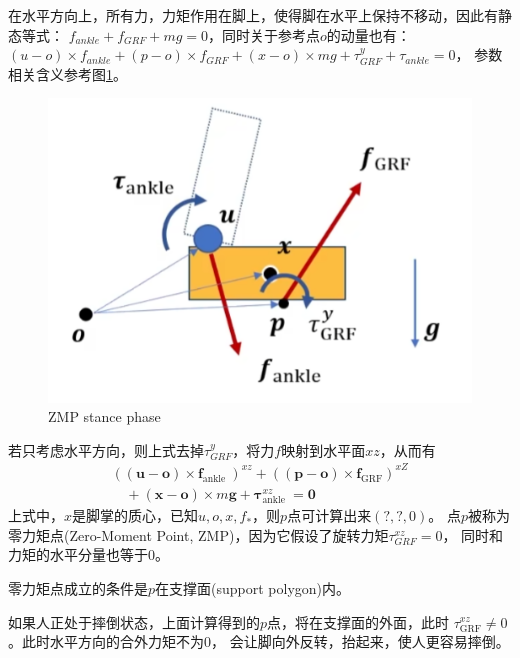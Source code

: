 \documentclass[lang=cn,newtx,10pt,scheme=chinese]{elegantbook}
\begin{document}
在水平方向上，所有力，力矩作用在脚上，使得脚在水平上保持不移动，因此有静态等式：
$f_{ankle} + f_{GRF} + mg = 0$，同时关于参考点$o$的动量也有：$(u -o)\times f_{ankle} + (p-o)\times f_{GRF}
+ (x-o)\times mg + \tau_{GRF}^{y} + \tau_{ankle} = 0 $，
参数相关含义参考图\ref{fig:ZMP-stance-phase}。
\begin{figure}[htbp]
  \centering
  \includegraphics[totalheight=1.6in]{"./image/ZMP-stance-phase.png"}
  \caption{ZMP stance phase} \label{fig:ZMP-stance-phase}
\end{figure}
若只考虑水平方向，则上式去掉$\tau_{GRF}^{y}$，将力$f$映射到水平面$xz$，从而有
\begin{equation}
  \begin{array}{r}
  \left((\boldsymbol{u}-\boldsymbol{o}) \times \boldsymbol{f}_{\text {ankle }}\right)^{x z}+\left((\boldsymbol{p}-\mathbf{o}) \times \boldsymbol{f}_{\mathrm{GRF}}\right)^{x Z} \\
  \quad+(\boldsymbol{x}-\boldsymbol{o}) \times m \boldsymbol{g}+\boldsymbol{\tau}_{\text {ankle }}^{x z}=\mathbf{0}
  \end{array}
\end{equation}
上式中，$x$是脚掌的质心，已知$u, o, x,f_{*}$，则$p$点可计算出来$(?,?,0)$。
点$p$被称为零力矩点(Zero-Moment Point, ZMP)，因为它假设了旋转力矩$\tau_{GRF}^{xz}=0$，
同时和力矩的水平分量也等于$0$。

零力矩点成立的条件是$p$在支撑面(support polygon)内。

如果人正处于摔倒状态，上面计算得到的$p$点，将在支撑面的外面，此时
$\tau_{\mathrm{GRF}}^{xz} \neq 0$。此时水平方向的合外力矩不为0，
会让脚向外反转，抬起来，使人更容易摔倒。
\end{document}
